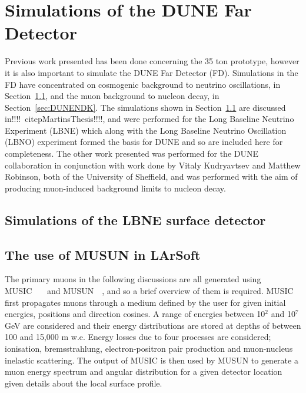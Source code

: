 
\chapter{Simulations of the DUNE Far Detector}  %
\graphicspath{{FarDetectorSimulations/Figs/Raster/}{FarDetectorSimulations/Figs/PDF/}{FarDetectorSimulations/Figs/}}

Previous work presented has been done concerning the 35 ton prototype, however it is also important to simulate the DUNE Far Detector (FD). Simulations in the FD have concentrated on cosmogenic background to neutrino oscillations, in Section~\ref{sec:LBNESurf}, and the muon background to nucleon decay, in Section~\ref{sec:DUNENDK}. The simulations shown in Section~\ref{sec:LBNESurf} are discussed in!!!!~citep{MartinsThesis}!!!!, and were performed for the Long Baseline Neutrino Experiment (LBNE) which along with the Long Baseline Neutrino Oscillation (LBNO) experiment formed the basis for DUNE and so are included here for completeness. The other work presented was performed for the DUNE collaboration in conjunction with work done by Vitaly Kudryavtsev and Matthew Robinson, both of the University of Sheffield, and was performed with the aim of producing muon-induced background limits to nucleon decay. \\

\section{Simulations of the LBNE surface detector} \label{sec:LBNESurf} %

\section{The use of MUSUN in LArSoft} \label{sec:FDIncorporation}  %
The primary muons in the following discussions are all generated using MUSIC~\citep{MUSUN}~\citep{MUSIC}~\citep{MUSIC2} and MUSUN~\citep{MUSUN}~\citep{MUSUN2}, and so a brief overview of them is required. MUSIC first propagates muons through a medium defined by the user for given initial energies, positions and direction cosines. A range of energies between 10$^2$ and 10$^7$ GeV are considered and their energy distributions are stored at depths of between 100 and 15,000 m w.e. Energy losses due to four processes are considered; ionisation, bremsstrahlung, electron-positron pair production and muon-nucleus inelastic scattering. The output of MUSIC is then used by MUSUN to generate a muon energy spectrum and angular distribution for a given detector location given details about the local surface profile. \\

